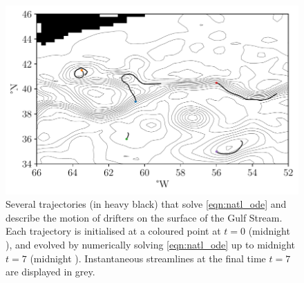 
\begin{figure}[t]
	\centering
	\includegraphics[width=\textwidth]{chp06_applications/figures/gulf_stream/det_trajs}
	\caption{Several trajectories (in heavy black) that solve \cref{eqn:natl_ode} and describe the motion of drifters on the surface of the Gulf Stream.
		Each trajectory is initialised at a coloured point at \(t = 0\) (midnight ), and evolved by numerically solving \cref{eqn:natl_ode} up to midnight \(t = 7\) (midnight ).
		Instantaneous streamlines at the final time \(t = 7\) are displayed in grey.}
	\label{fig:natl_ode_sols}
\end{figure}

